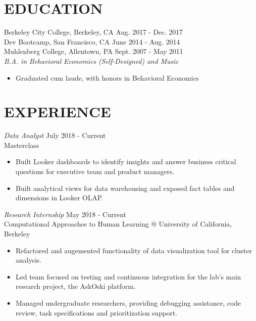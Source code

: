 \documentclass[margin, 10pt]{res} %
\begin{document}
\begin{resume}


\section{\small\bf EDUCATION}
Berkeley City College, Berkeley, CA \hfill Aug. 2017 - Dec. 2017 \\
Dev Bootcamp, San Francisco, CA \hfill June 2014 - Aug. 2014 \\
Muhlenberg College, Allentown, PA \hfill Sept. 2007 - May 2011 \\
{\sl B.A. in Behavioral Economics (Self-Designed) and Music}
\begin{itemize} \itemsep -2pt %
\item Graduated cum laude, with honors in Behavioral Economics
\end{itemize}



\section{\small\bf EXPERIENCE}

{\sl Data Analyst} \hfill July 2018 - Current \\
Masterclass
\begin{itemize} \itemsep -2pt %
\item Built Looker dashboards to identify insights and answer business critical questions for executive team and product managers.
\item Built analytical views for data warehousing and exposed fact tables and dimensions in Looker OLAP.
\end{itemize}

{\sl Research Internship} \hfill May 2018 - Current \\
Computational Approaches to Human Learning @ University of California, Berkeley
\begin{itemize} \itemsep -2pt %
\item Refactored and augemented functionality of data visualization tool for cluster analysis.
\item Led team focused on testing and continuous integration for the lab's main research project, the AskOski platform.
\item Managed undergraduate researchers, providing debugging assistance, code review, task specifications and prioritization support.
\end{itemize}


\end{resume}
\end{document}
